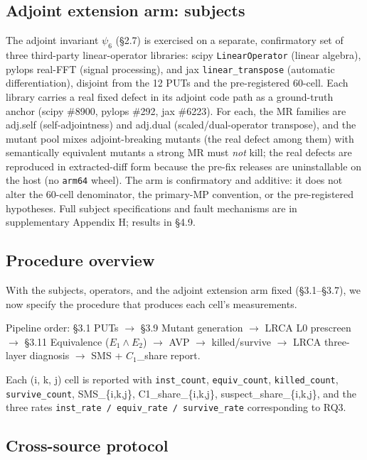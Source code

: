 \documentclass[acmsmall,screen,review]{acmart}
\begin{document}
\subsection{Adjoint extension arm: subjects}\label{adjoint-extension-arm-subjects}

The adjoint invariant $\psi_6$ (§2.7) is exercised on a separate,
confirmatory set of three third-party linear-operator libraries:
scipy \texttt{LinearOperator} (linear algebra), pylops real-FFT (signal
processing), and jax \texttt{linear\_transpose} (automatic
differentiation), disjoint from the 12 PUTs and the pre-registered
60-cell. Each library carries a real fixed defect in its adjoint code
path as a ground-truth anchor (scipy \#8900, pylops \#292, jax \#6223).
For each, the MR families are adj.self (self-adjointness) and adj.dual
(scaled/dual-operator transpose), and the mutant pool mixes
adjoint-breaking mutants (the real defect among them) with semantically
equivalent mutants a strong MR must \emph{not} kill; the real defects are
reproduced in extracted-diff form because the pre-fix releases are
uninstallable on the host (no \texttt{arm64} wheel). The arm is
confirmatory and additive: it does not alter the 60-cell denominator, the
primary-MP convention, or the pre-registered hypotheses. Full subject
specifications and fault mechanisms are in supplementary Appendix H;
results in §4.9.

\subsection{Procedure overview}\label{procedure-overview}

With the subjects, operators, and the adjoint extension arm fixed
(§3.1--§3.7), we now specify the procedure that produces each cell's
measurements.

\noindent\textsf{\small Pipeline order: §3.1 PUTs $\to$ §3.9 Mutant generation $\to$ LRCA L0 prescreen $\to$ §3.11 Equivalence ($E_1 \wedge E_2$) $\to$ AVP $\to$ killed/survive $\to$ LRCA three-layer diagnosis $\to$ SMS + $C_1$\_share report.}

Each (i, k, j) cell is reported with \texttt{inst\_count},
\texttt{equiv\_count}, \texttt{killed\_count}, \texttt{survive\_count},
SMS\_\{i,k,j\}, C1\_share\_\{i,k,j\}, suspect\_share\_\{i,k,j\}, and the
three rates \texttt{inst\_rate\ /\ equiv\_rate\ /\ survive\_rate}
corresponding to RQ3.

\subsection{Cross-source protocol}\label{cross-source-v4-protocol-summary}
\end{document}
